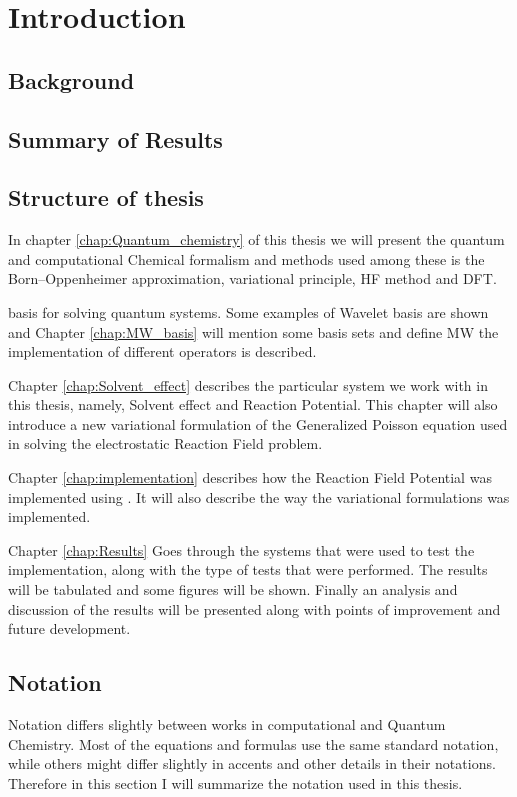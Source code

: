 \documentclass[../master_thesis.tex]{subfiles}
\begin{document}
\chapter{Introduction}
\section{Background}

\section{Summary of Results}

\section{Structure of thesis}
In chapter \ref{chap:Quantum_chemistry} of this thesis we will present the quantum
and computational Chemical formalism and methods used among these is the
Born--Oppenheimer approximation, variational principle, \ac{HF} method and
\ac{DFT}.

basis for solving quantum systems. Some examples of Wavelet basis are shown and
Chapter \ref{chap:MW_basis} will mention some basis sets and define \ac{MW}
the implementation of different operators is described.

Chapter \ref{chap:Solvent_effect}
describes the particular system we work with in this thesis, namely, Solvent
effect and Reaction Potential. This chapter will also introduce a new variational
formulation of the Generalized Poisson equation used in solving the electrostatic
Reaction Field problem.

Chapter \ref{chap:implementation} describes how the Reaction Field Potential was implemented
using \mrchem. It will also describe the way the variational formulations was implemented.

Chapter \ref{chap:Results} Goes through the systems that were used to test the implementation,
along with the type of tests that were performed. The results will be tabulated and
some figures will be shown. Finally an analysis and discussion of the results will be
presented along with points of improvement and future development.
\section{Notation}
Notation differs slightly between works in computational and Quantum Chemistry.
Most of the equations and formulas use the same standard notation, while others
might differ slightly in accents and other details in their notations. Therefore
in this section I will summarize the notation used in this thesis.
\end{document}
